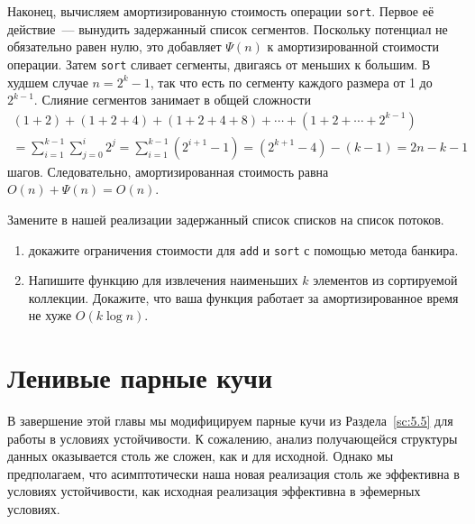Наконец, вычисляем амортизированную стоимость операции
\lstinline!sort!. Первое её действие~--- вынудить задержанный список
сегментов.  Поскольку потенциал не обязательно равен нулю, это
добавляет $\Psi(n)$ к амортизированной стоимости операции. Затем
\lstinline!sort! сливает сегменты, двигаясь от меньших к большим. В
худшем случае $n = 2^k -1$, так что есть по сегменту каждого размера
от 1 до $2^{k-1}$. Слияние сегментов занимает в общей сложности
$$
\begin{array}{l}
(1+2) + (1+2+4) + (1+2+4+8) + \cdots + (1 + 2 + \cdots + 2^{k-1}) \\
= \sum_{i=1}^{k-1}\sum_{j=0}^i 2^j = \sum_{i=1}^{k-1}(2^{i+1} - 1)
= (2^{k+1} - 4) - (k - 1) = 2n - k - 1
\end{array}
$$
шагов. Следовательно, амортизированная стоимость равна 
$O(n) + \Psi(n) = O(n)$.

\begin{exercise}\label{ex:6.7}
Замените в нашей реализации задержанный список списков на список
потоков.
\begin{enumerate}
\item докажите ограничения стоимости для \lstinline!add! и
  \lstinline!sort! с помощью метода банкира.
\item Напишите функцию для извлечения наименьших $k$ элементов из
  сортируемой коллекции. Докажите, что ваша функция работает за
  амортизированное время не хуже $O(k \log n)$.
\end{enumerate}
\end{exercise}

\section{Ленивые парные кучи}
\label{sc:6.5}

В завершение этой главы мы модифицируем парные кучи из
Раздела~\ref{sc:5.5} для работы в условиях устойчивости. К сожалению,
анализ получающейся структуры данных оказывается столь же сложен, как
и для исходной. Однако мы предполагаем, что асимптотически наша новая
реализация столь же эффективна в условиях устойчивости, как исходная
реализация эффективна в эфемерных условиях.

